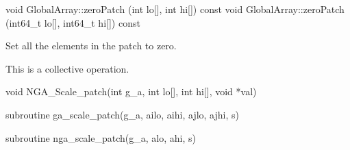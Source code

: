 \documentclass[12pt]{article}
\begin{document}
\begin{cxxapi}
\begin{cxxcode}
void GlobalArray::zeroPatch (int lo[], int hi[]) const
void GlobalArray::zeroPatch (int64_t lo[], int64_t hi[]) const
\end{cxxcode}
\begin{funcargs}
\end{funcargs}
\end{cxxapi}

\begin{desc}


Set all the elements in the patch to zero.

This is a collective operation.

\end{desc}


\begin{capi}
\begin{ccode}
void NGA_Scale_patch(int g_a, int lo[], int hi[], void *val)
\end{ccode}
\begin{funcargs}
\end{funcargs}
\end{capi}

\begin{f2dapi}
\begin{fcode}
subroutine ga_scale_patch(g_a, ailo, aihi, ajlo, ajhi, s)
\end{fcode}
\begin{funcargs}
\end{funcargs}
\end{f2dapi}

\begin{fapi}
\begin{fcode}
subroutine nga_scale_patch(g_a, alo, ahi, s)
\end{fcode}
\begin{funcargs}
\end{funcargs}
\end{fapi}
\end{document}
